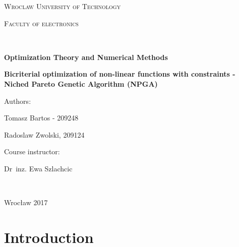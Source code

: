 \documentclass[a4paper, 11pt]{article}
\begin{document}
\begin{titlepage}
	\centering
	{\scshape\LARGE Wroclaw University of Technology \par}
	\vspace{0.2cm}
	{\scshape\Large Faculty of electronics\par}
	\noindent\hrulefill\\
	\vspace{3cm}
	{\LARGE\bfseries Optimization Theory and Numerical Methods\par}
	\vspace{1.5cm}
	{\large\bfseries Bicriterial optimization of non-linear functions with constraints - Niched Pareto Genetic Algorithm (NPGA)\par}
	\vspace{2cm}

\begin{minipage}{0.4\textwidth}
\begin{flushleft}
	{\large Authors:\par}
	{Tomasz Bartos - 209248\par}
	{Radoslaw Zwolski, 209124\par}
\end{flushleft}
\end{minipage}
\begin{minipage}{0.55\textwidth}
\begin{flushright}
{\large Course instructor:\ \ \ \ \par}
{Dr~inz. Ewa Szlachcic\par}
\end{flushright}
\end{minipage}

\vspace{2cm}

\begin{minipage}{0.6\textwidth}
\begin{flushright}
\end{flushright}
\end{minipage}
	
\vfill
\noindent\hrulefill\\
{\large Wrocław 2017\par}
\end{titlepage}

	\tableofcontents
	
	\newpage

	\section{Introduction}
	
\end{document}
